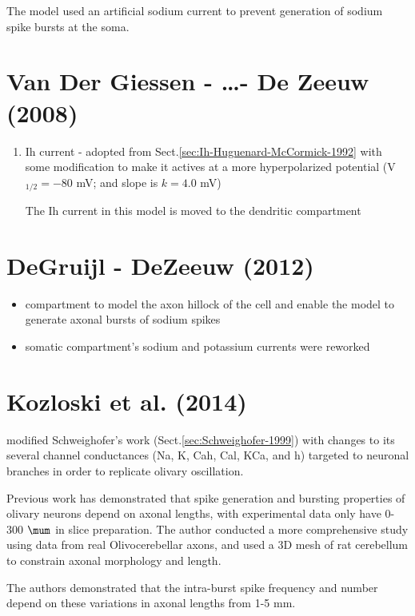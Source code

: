 The model used an artificial sodium current to prevent generation of sodium
spike bursts at the soma.

\section{Van Der Giessen - \ldots - De Zeeuw (2008)}
\label{sec:VanDerGiessen-DeZeeuw-2008}

\begin{enumerate}
  \item Ih current - adopted from Sect.\ref{sec:Ih-Huguenard-McCormick-1992}
  with some modification to make it actives at a more hyperpolarized potential
  (V$_{1/2} = -80$ mV; and slope is $k=4.0$ mV)
  
The Ih current in this model is moved to the dendritic compartment


\end{enumerate}

\section{DeGruijl - DeZeeuw (2012)}

\begin{itemize}
  \item compartment to model the axon hillock of the cell and
enable the model to generate axonal bursts of sodium spikes

  \item somatic compartment's sodium and potassium currents were reworked
\end{itemize}

\section{Kozloski et al. (2014)}


\citep{kozloski2014} modified Schweighofer's work
(Sect.\ref{sec:Schweighofer-1999}) with changes to its several channel
conductances (Na, K, Cah, Cal, KCa, and h) targeted to neuronal branches in
order to replicate olivary oscillation.


Previous work has demonstrated that spike generation and bursting properties of
olivary neurons depend on axonal lengths, with experimental data only have 0-300
$\mum$ in slice preparation. The author conducted a more comprehensive study
using data from real Olivocerebellar axons, and used a 3D mesh of rat cerebellum
to constrain axonal morphology and length.

The authors demonstrated that the intra-burst spike frequency and number depend
on these variations in axonal lengths from 1-5 mm.
